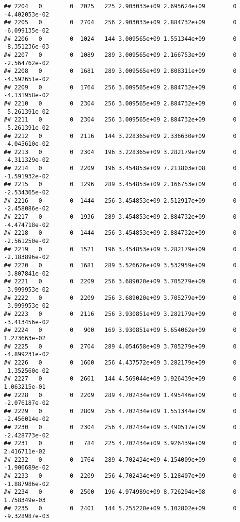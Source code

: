 \documentclass[
]{article}
\begin{document}
\begin{enumerate}
\begin{verbatim}
## 2204   0        0  2025   225 2.903033e+09 2.695624e+09        0 -4.402053e-02
## 2205   0        0  2704   256 2.903033e+09 2.884732e+09        0 -6.099135e-02
## 2206   0        0  1024   144 3.009565e+09 1.551344e+09        0 -8.351236e-03
## 2207   0        0  1089   289 3.009565e+09 2.166753e+09        0 -2.564762e-02
## 2208   0        0  1681   289 3.009565e+09 2.808311e+09        0 -4.592651e-02
## 2209   0        0  1764   256 3.009565e+09 2.884732e+09        0 -4.131958e-02
## 2210   0        0  2304   256 3.009565e+09 2.884732e+09        0 -5.261391e-02
## 2211   0        0  2304   256 3.009565e+09 2.884732e+09        0 -5.261391e-02
## 2212   0        0  2116   144 3.228365e+09 2.336630e+09        0 -4.045610e-02
## 2213   0        0  2304   196 3.228365e+09 3.282179e+09        0 -4.311329e-02
## 2214   0        0  2209   196 3.454853e+09 7.211803e+08        0 -1.591932e-02
## 2215   0        0  1296   289 3.454853e+09 2.166753e+09        0 -2.534365e-02
## 2216   0        0  1444   256 3.454853e+09 2.512917e+09        0 -2.458086e-02
## 2217   0        0  1936   289 3.454853e+09 2.884732e+09        0 -4.474718e-02
## 2218   0        0  1444   256 3.454853e+09 2.884732e+09        0 -2.561250e-02
## 2219   0        0  1521   196 3.454853e+09 3.282179e+09        0 -2.183896e-02
## 2220   0        0  1681   289 3.526626e+09 3.532959e+09        0 -3.807841e-02
## 2221   0        0  2209   256 3.689020e+09 3.705279e+09        0 -3.999953e-02
## 2222   0        0  2209   256 3.689020e+09 3.705279e+09        0 -3.999953e-02
## 2223   0        0  2116   256 3.930851e+09 3.282179e+09        0 -3.413456e-02
## 2224   0        0   900   169 3.930851e+09 5.654062e+09        0  1.273663e-02
## 2225   0        0  2704   289 4.054658e+09 3.705279e+09        0 -4.899231e-02
## 2226   0        0  1600   256 4.437572e+09 3.282179e+09        0 -1.352560e-02
## 2227   0        0  2601   144 4.569044e+09 3.926439e+09        0  1.063215e-01
## 2228   0        0  2209   289 4.702434e+09 1.495446e+09        0 -2.076187e-02
## 2229   0        0  2809   256 4.702434e+09 1.551344e+09        0 -2.456014e-02
## 2230   0        0  2304   256 4.702434e+09 3.490517e+09        0 -2.428773e-02
## 2231   0        0   784   225 4.702434e+09 3.926439e+09        0  2.416711e-02
## 2232   0        0  1764   289 4.702434e+09 4.154009e+09        0 -1.906689e-02
## 2233   0        0  2209   256 4.702434e+09 5.128407e+09        0 -1.887986e-02
## 2234   0        0  2500   196 4.974989e+09 8.726294e+08        0  1.758349e-03
## 2235   0        0  2401   144 5.255220e+09 5.102802e+09        0 -9.328987e-03

\end{verbatim}
\end{enumerate}
\end{document}
